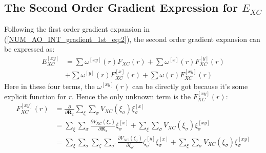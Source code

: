 \subsection{The Second Order Gradient Expression for $E_{XC}$}
%
%
%
%
Following the first order gradient expansion in
(\ref{NUM_AO_INT_gradient_1st_eq:2}), the second order gradient expansion can
be expressed as:
\begin{equation}
\begin{split}
  E_{XC}^{[xy]} &=  
\sum\omega^{[xy]}(r)F_{XC}(r) + 
\sum\omega^{[x]}(r)F^{[y]}_{XC}(r) \\
&+ 
\sum\omega^{[y]}(r)F^{[x]}_{XC}(r) +
\sum\omega(r)F^{[xy]}_{XC}(r)  
\end{split}
 \label{NUM_AO_INT_gradient_2ed_eq:1}
\end{equation}
Here in these four terms,  the $\omega^{[xy]}(r)$ can be directly got because
it's some explicit function for $r$. Hence the only unknown term is the
$F^{[xy]}_{XC}(r)$:
\begin{align}
 F^{[xy]}_{XC}(r) &= \frac{\partial}{\partial \bm{R}_{x}}\sum_{\xi}\sum_{\sigma}
V_{XC}(\xi_{\sigma})\xi_{\sigma}^{[x]} \nonumber \\
&= \sum_{\xi}\sum_{\sigma} \frac{\partial
V_{XC}(\xi_{\sigma})}{\partial \bm{R}_{x}}\xi_{\sigma}^{[x]} +
\sum_{\xi}\sum_{\sigma}
V_{XC}(\xi_{\sigma})\xi_{\sigma}^{[xy]} \nonumber \\
&= \sum_{\xi}\sum_{\sigma}\sum_{\zeta}\sum_{\sigma^{'}} \frac{\partial
V_{XC}(\xi_{\sigma})}{\partial
\zeta_{\sigma^{'}}}\zeta_{\sigma^{'}}^{[y]}\xi_{\sigma}^{[x]} +
\sum_{\xi}\sum_{\sigma}
V_{XC}(\xi_{\sigma})\xi_{\sigma}^{[xy]} \nonumber \\
\end{align}

 

